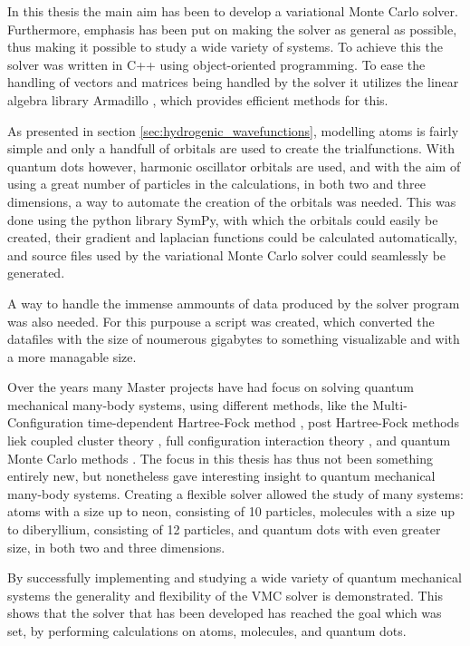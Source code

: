 
In this thesis the main aim has been to develop a variational Monte Carlo
solver. Furthermore, emphasis has been put on making the solver as
general as possible, thus making it possible to study a wide variety
of systems. To achieve this the solver was written in C++ using
object-oriented programming. To ease the handling of vectors and
matrices being handled by the solver it utilizes the linear algebra
library Armadillo \cite{sanderson2010armadillo}, which provides
efficient methods for this.

As presented in section \ref{sec:hydrogenic_wavefunctions}, modelling
atoms is fairly simple and only a handfull of orbitals are used to
create the trialfunctions. With quantum dots however, harmonic
oscillator orbitals are used, and with the aim of using a great number
of particles in the calculations, in both two and three dimensions, a
way to automate the creation of the orbitals was needed. This was done
using the python library SymPy, with which the orbitals could easily
be created, their gradient and laplacian functions could be calculated
automatically, and source files used by the variational Monte Carlo
solver could seamlessly be generated.

A way to handle the immense ammounts of data produced by the solver
program was also needed. For this purpouse a script was created, which
converted the datafiles with the size of noumerous gigabytes to
something visualizable and with a more managable size.

Over the years many Master projects have had focus on solving quantum
mechanical many-body systems, using different methods, like the
Multi-Configuration time-dependent Hartree-Fock method \cite{skattum13}, post Hartree-Fock
methods liek coupled cluster theory \cite{hirthCC}, full configuration interaction theory  \cite{olsenFCI}, and quantum Monte Carlo
methods \cite{hogbergetDMC}. The focus in this thesis has thus not
been something entirely new, but nonetheless gave interesting insight
to quantum mechanical many-body systems. Creating a flexible solver
allowed the study of many systems: atoms with a size up to neon,
consisting of 10 particles, molecules with a size up to diberyllium,
consisting of 12 particles, and quantum dots with even greater size,
in both two and three dimensions.

By successfully implementing and studying a wide variety of quantum
mechanical systems the generality and flexibility of the VMC solver is
demonstrated. This shows that the solver that has been developed has
reached the goal which was set, by performing calculations on atoms,
molecules, and quantum dots.

